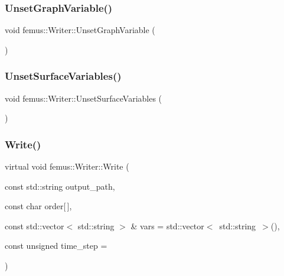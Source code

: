 \subsubsection{\texorpdfstring{Unset\+Graph\+Variable()}{UnsetGraphVariable()}}
{\footnotesize\ttfamily void femus\+::\+Writer\+::\+Unset\+Graph\+Variable (\begin{DoxyParamCaption}{ }\end{DoxyParamCaption})\hspace{0.3cm}{\ttfamily [inline]}}

\mbox{\label{classfemus_1_1_writer_aee6d76214fc7c1766e0394a638563869}} 
\subsubsection{\texorpdfstring{Unset\+Surface\+Variables()}{UnsetSurfaceVariables()}}
{\footnotesize\ttfamily void femus\+::\+Writer\+::\+Unset\+Surface\+Variables (\begin{DoxyParamCaption}{ }\end{DoxyParamCaption})\hspace{0.3cm}{\ttfamily [inline]}}

\mbox{\label{classfemus_1_1_writer_aa0f7400e0546946f317cc361397d97bd}} 
\subsubsection{\texorpdfstring{Write()}{Write()}}
{\footnotesize\ttfamily virtual void femus\+::\+Writer\+::\+Write (\begin{DoxyParamCaption}\item[{const std\+::string}]{output\+\_\+path,  }\item[{const char}]{order\mbox{[}$\,$\mbox{]},  }\item[{const std\+::vector$<$ std\+::string $>$ \&}]{vars = {\ttfamily std\+:\+:vector$<$~std\+:\+:string~$>$()},  }\item[{const unsigned}]{time\+\_\+step = {} }\end{DoxyParamCaption})\hspace{0.3cm}{\ttfamily [pure virtual]}}

